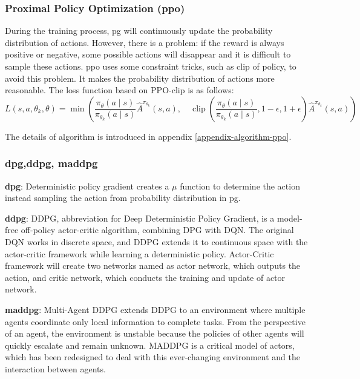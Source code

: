 \subsubsection{Proximal Policy Optimization (\gls{ppo})}
During the training process, \gls{pg} will continuously update the probability distribution of actions. However, there is a problem: if the reward is always positive or negative, some possible actions will disappear and it is difficult to sample these actions. \gls{ppo} uses some constraint tricks, such as clip of policy, to avoid this problem. It makes the probability distribution of actions more reasonable. The loss function based on PPO-clip is as follows:
\begin{equation}
L\left(s, a, \theta_{k}, \theta\right)=\min \left(\frac{\pi_{\theta}(a \mid s)}{\pi_{\theta_{k}}(a \mid s)} \hat{A}^{\pi_{\theta_{k}}}(s, a), \quad \operatorname{clip}\left(\frac{\pi_{\theta}(a \mid s)}{\pi_{\theta_{k}}(a \mid s)}, 1-\epsilon, 1+\epsilon\right) \hat{A}^{\pi_{\theta_{k}}}(s, a)\right)
\end{equation} 

The details of algorithm is introduced in appendix \ref{appendix-algorithm-ppo}.

\subsubsection{\gls{dpg},\gls{ddpg}, \gls{maddpg}} \label{background:maddpg}

\textbf{\gls{dpg}}: Deterministic policy gradient creates a $\mu$ function to determine the action instead sampling the action from probability distribution in \gls{pg}.

\textbf{\gls{ddpg}}: DDPG\parencite{Lillicrap2015}, abbreviation for Deep Deterministic Policy Gradient, is a model-free off-policy actor-critic algorithm, combining DPG with DQN. The original DQN works in discrete space, and DDPG extends it to continuous space with the actor-critic framework while learning a deterministic policy. Actor-Critic framework will create two networks named as actor network, which outputs the action, and critic network, which conducts the training and update of actor network.

\textbf{\gls{maddpg}}: Multi-Agent DDPG\parencite{maddpg2017} extends DDPG to an environment where multiple agents coordinate only local information to complete tasks. From the perspective of an agent, the environment is unstable because the policies of other agents will quickly escalate and remain unknown. MADDPG is a critical model of actors, which has been redesigned to deal with this ever-changing environment and the interaction between agents. 

